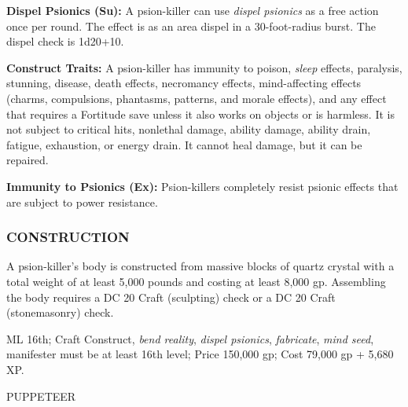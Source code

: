 \documentclass{article}
\begin{document}
\textbf{Dispel Psionics (Su):} A psion-killer can use \textit{dispel psionics }as 
a free action once per round. The effect is as an area dispel in a 30-foot-radius 
burst. The dispel check is 1d20+10.

\textbf{Construct Traits:} A psion-killer has immunity to poison, \textit{sleep 
}effects, paralysis, stunning, disease, death effects, necromancy effects, mind-affecting 
effects (charms, compulsions, phantasms, patterns, and morale effects), and any 
effect that requires a Fortitude save unless it also works on objects or is harmless. 
It is not subject to critical hits, nonlethal damage, ability damage, ability drain, 
fatigue, exhaustion, or energy drain. It cannot heal damage, but it can be repaired.

\textbf{Immunity to Psionics (Ex): }Psion-killers completely resist psionic effects 
that are subject to power resistance.

\subsubsection*{CONSTRUCTION}

A psion-killer's body is constructed from massive blocks of quartz crystal with 
a total weight of at least 5,000 pounds and costing at least 8,000 gp. Assembling 
the body requires a DC 20 Craft (sculpting) check or a DC 20 Craft (stonemasonry) 
check.

ML 16th; Craft Construct, \textit{bend reality}, \textit{dispel psionics}, \textit{fabricate}, 
\textit{mind seed}, manifester must be at least 16th level; Price 150,000 gp; Cost 
79,000 gp + 5,680 XP.

\vspace{12pt}
{\LARGE{}PUPPETEER}
\end{document}
